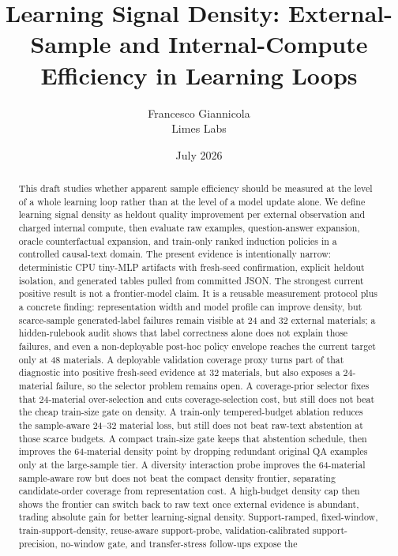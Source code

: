 \documentclass[11pt]{article}
\title{Learning Signal Density: External-Sample and Internal-Compute Efficiency in Learning Loops}
\author{Francesco Giannicola \\ Limes Labs}
\date{July 2026}
\begin{document}
\maketitle

\begin{abstract}
This draft studies whether apparent sample efficiency should be measured at the
level of a whole learning loop rather than at the level of a model update
alone. We define learning signal density as heldout quality improvement per
external observation and charged internal compute, then evaluate raw examples,
question-answer expansion, oracle counterfactual expansion, and train-only
ranked induction policies in a controlled causal-text domain. The present
evidence is intentionally narrow: deterministic CPU tiny-MLP artifacts with
fresh-seed confirmation, explicit heldout isolation, and generated tables
pulled from committed JSON. The strongest current positive result is not a
frontier-model claim. It is a reusable measurement protocol plus a concrete
finding: representation width and model profile can improve density, but
scarce-sample generated-label failures remain visible at 24 and 32 external
materials; a hidden-rulebook audit shows that label correctness alone does not
explain those failures, and even a non-deployable post-hoc policy envelope
reaches the current target only at 48 materials. A deployable validation
coverage proxy turns part of that diagnostic into positive fresh-seed evidence
at 32 materials, but also exposes a 24-material failure, so the selector
problem remains open. A coverage-prior selector fixes that 24-material
over-selection and cuts coverage-selection cost, but still does not beat the
cheap train-size gate on density. A train-only tempered-budget ablation reduces
the sample-aware 24--32 material loss, but still does not beat raw-text
abstention at those scarce budgets. A compact train-size gate keeps that
abstention schedule, then improves the 64-material density point by dropping
redundant original QA examples only at the large-sample tier. A diversity
interaction probe improves the 64-material sample-aware row but does not beat
the compact density frontier, separating candidate-order coverage from
representation cost. A high-budget density cap then shows the frontier can
switch back to raw text once external evidence is abundant, trading absolute
gain for better learning-signal density. Support-ramped, fixed-window,
train-support-density, reuse-aware support-probe, validation-calibrated
support-precision, no-window gate, and transfer-stress follow-ups expose the

\end{abstract}
\end{document}
